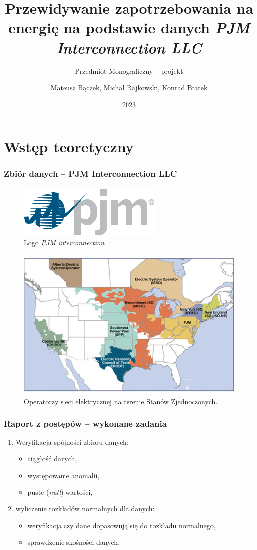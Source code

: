 \documentclass[]{beamer}
\title{Przewidywanie zapotrzebowania na energię na podstawie danych \textit{PJM Interconnection LLC}}
\subtitle{Przedmiot Monograficzny -- projekt}
\author{Mateusz Bączek, Michał Rajkowski, Konrad Bratek}
\institute{Politechnika Wrocławska}
\date{2023}
\begin{document}
\frame{\titlepage}

\section{Wstęp teoretyczny}

\begin{frame}
\frametitle{Zbiór danych -- PJM Interconnection LLC}
  \begin{figure}
    \centering
    \includegraphics[width=0.3\linewidth]{pjm-logo.png}
    \vspace{-0.3cm}
    \caption{Logo \textit{PJM interconnection}}
  \end{figure}
  \vspace{-0.5cm}
  \begin{figure}
    \centering
    \includegraphics[width=0.6\linewidth]{rto_map.jpg}
    \vspace{-0.3cm}
    \caption{Operatorzy sieci elektrycznej na terenie Stanów Zjednoczonych.}
  \end{figure}

\end{frame}

\begin{frame}
\frametitle{Raport z postępów -- wykonane zadania}

  \begin{enumerate}
    \item Weryfikacja spójności zbioru danych:
      \begin{itemize}
        \item ciągłość danych,
        \item występowanie anomalii,
        \item puste (\textit{null}) wartości,
      \end{itemize}
    \item wyliczenie rozkładów normalnych dla danych:
      \begin{itemize}
        \item weryfikacja czy dane dopasowują się do rozkładu normalnego,
        \item sprawdzenie skośności danych,
      \end{itemize}
  \end{enumerate}

\end{frame}
\end{document}
